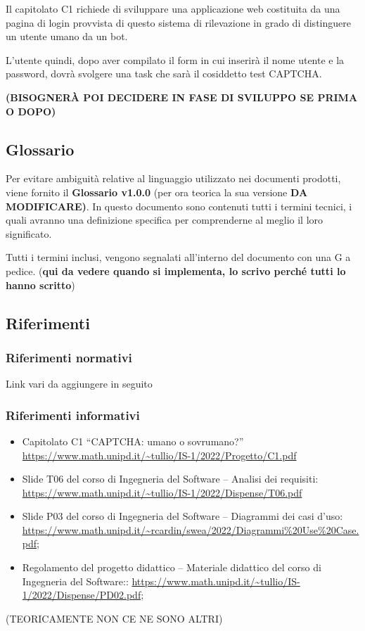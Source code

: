 Il capitolato C1 richiede di sviluppare una applicazione web costituita da una pagina di login provvista di questo sistema di rilevazione in grado di distinguere un utente umano da un bot.

L’utente quindi, dopo aver compilato il form in cui inserirà il nome utente e la password, dovrà svolgere una task che sarà il cosiddetto test CAPTCHA.

\textbf{(BISOGNERÀ POI DECIDERE IN FASE DI SVILUPPO SE PRIMA O DOPO)}

\subsection{Glossario}
Per evitare ambiguità relative al linguaggio utilizzato nei documenti prodotti, viene fornito il \textbf{Glossario v1.0.0} (per ora teorica la sua versione \textbf{DA MODIFICARE)}. In questo documento sono contenuti tutti i termini tecnici, i quali avranno una definizione specifica per comprenderne al meglio il loro significato.

Tutti i termini inclusi, vengono segnalati all’interno del documento con una G a pedice. (\textbf{qui da vedere quando si implementa, lo scrivo perché tutti lo hanno scritto})

\subsection{Riferimenti}

\subsubsection{Riferimenti normativi}
Link vari da aggiungere in seguito

\subsubsection{Riferimenti informativi}

\begin{itemize}
 	\item Capitolato C1 “CAPTCHA: umano o sovrumano?”
		\url{https://www.math.unipd.it/~tullio/IS-1/2022/Progetto/C1.pdf}
	\item Slide T06 del corso di Ingegneria del Software – Analisi dei requisiti:
		\url{https://www.math.unipd.it/~tullio/IS-1/2022/Dispense/T06.pdf}
	\item Slide P03 del corso di Ingegneria del Software – Diagrammi dei casi d’uso:
		\url{https://www.math.unipd.it/~rcardin/swea/2022/Diagrammi%20Use%20Case.pdf};
	\item Regolamento del progetto didattico – Materiale didattico del corso di Ingegneria del Software::
		\url{https://www.math.unipd.it/~tullio/IS-1/2022/Dispense/PD02.pdf};
\end{itemize}

(TEORICAMENTE NON CE NE SONO ALTRI)